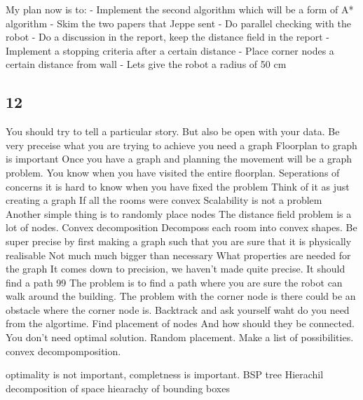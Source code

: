 My plan now is to:
- Implement the second algorithm which will be a form of A* algorithm
- Skim the two papers that Jeppe sent
- Do parallel checking with the robot
- Do a discussion in the report, keep the distance field in the report
- Implement a stopping criteria after a certain distance
- Place corner nodes a certain distance from wall
- Lets give the robot a radius of 50 cm


\subsection{12}
You should try to tell a particular story. But also be open with your data.
Be very preceise what you are trying to achieve 
you need a graph 
Floorplan to graph is important
Once you have a graph and planning the movement will be a graph problem.
You know when you have visited the entire floorplan.
Seperations of concerns it is hard to know when you have fixed the problem
Think of it as just creating a graph
If all the rooms were convex
Scalability is not a problem
Another simple thing is to randomly place nodes
The distance field problem is a lot of nodes.
Convex decomposition 
Decomposs each room into convex shapes.
Be super precise by first making a graph such that you are sure that it is physically realisable
Not much much bigger than necessary
What properties are needed for the graph
It comes down to precision, we haven't made quite precise.
It should find a path 99%
The problem is to find a path where you are sure the robot can walk around the building.
The problem with the corner node is there could be an obstacle where the corner node is.
Backtrack and ask yourself waht do you need from the algortime.
Find placement of nodes
And how should they be connected.
You don't need optimal solution.
Random placement.
Make a list of possibilities.
convex decompomposition.

optimality is not important, completness is important.
BSP tree
Hierachil decomposition of space
hiearachy of bounding boxes


